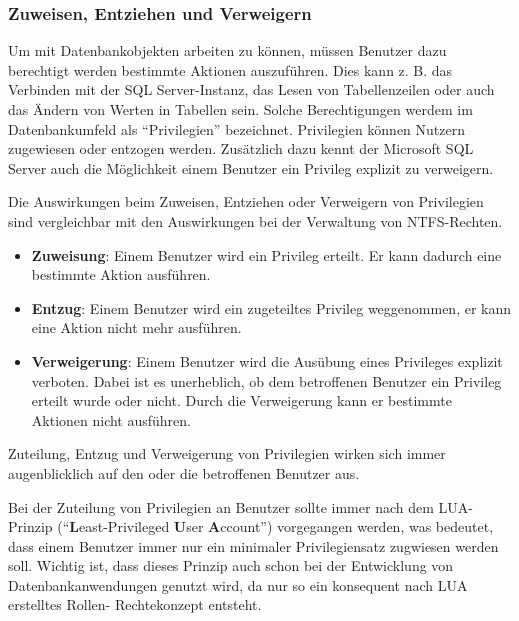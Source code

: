         \subsubsection{Zuweisen, Entziehen und Verweigern}
          Um mit Datenbankobjekten arbeiten zu können, müssen Benutzer dazu
          berechtigt werden bestimmte Aktionen auszuführen. Dies kann z. B. das
          Verbinden mit der SQL Server-Instanz, das Lesen von Tabellenzeilen
          oder auch das Ändern von Werten in Tabellen sein. Solche
          Berechtigungen werdem im Datenbankumfeld als \enquote{Privilegien}
          bezeichnet. Privilegien können Nutzern zugewiesen oder entzogen
          werden. Zusätzlich dazu kennt der Microsoft SQL Server auch die
          Möglichkeit einem Benutzer ein Privileg explizit zu verweigern.
          
          Die Auswirkungen beim Zuweisen, Entziehen oder Verweigern von
          Privilegien sind vergleichbar mit den Auswirkungen bei der
          Verwaltung von NTFS-Rechten.
          \begin{itemize}
            \item \textbf{Zuweisung}: Einem Benutzer wird ein Privileg erteilt.
            Er kann dadurch eine bestimmte Aktion ausführen.
            \item \textbf{Entzug}: Einem Benutzer wird ein zugeteiltes Privileg
            weggenommen, er kann eine Aktion nicht mehr ausführen.
            \item \textbf{Verweigerung}: Einem Benutzer wird die Ausübung eines
            Privileges explizit verboten. Dabei ist es unerheblich, ob dem
            betroffenen Benutzer ein Privileg erteilt wurde oder nicht. Durch
            die Verweigerung kann er bestimmte Aktionen nicht ausführen.
          \end{itemize}
          \begin{merke}
            Zuteilung, Entzug und Verweigerung von Privilegien wirken sich immer
            augenblicklich auf den oder die betroffenen Benutzer aus.
          \end{merke}
          Bei der Zuteilung von Privilegien an Benutzer sollte immer nach dem
          LUA-Prinzip (\enquote{\textbf{L}east-Privileged \textbf{U}ser
          \textbf{A}ccount}) vorgegangen werden, was bedeutet, dass einem
          Benutzer immer nur ein minimaler Privilegiensatz zugwiesen werden
          soll. Wichtig ist, dass dieses Prinzip auch schon bei der Entwicklung
          von Datenbankanwendungen genutzt wird, da nur so ein konsequent nach
          LUA erstelltes Rollen- Rechtekonzept entsteht.
